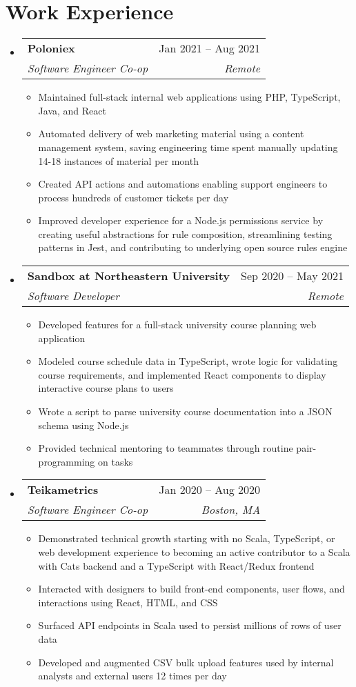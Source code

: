 \documentclass[letterpaper, 11pt]{article}
\makeatletter
\newcommand{\resumeItem}[1]{
  \item\small{
    {#1 \vspace{-2pt}}
  }
}
\newcommand{\resumeSubheading}[4]{
  \vspace{-2pt}\item
    \begin{tabular*}{0.97\textwidth}[t]{l@{\extracolsep{\fill}}r}
      \textbf{#1} & #2 \\
     \textit{\small#3} &  \textit{\small#4} \\
    \end{tabular*}\vspace{-7pt}
}
\newcommand{\resumeSubHeadingListStart}{\begin{itemize}[leftmargin=0.15in, label={}]}
\newcommand{\resumeSubHeadingListEnd}{\end{itemize}}
\newcommand{\resumeItemListStart}{\begin{itemize}}
\newcommand{\resumeItemListEnd}{\end{itemize}\vspace{-5pt}}
\makeatother
\begin{document}
\section{Work Experience}
    \resumeSubHeadingListStart    
        \resumeSubheading
            {Poloniex}{Jan 2021 -- Aug 2021}{Software Engineer Co-op}{Remote}
            \resumeItemListStart
                \resumeItem{Maintained full-stack internal web applications using PHP, TypeScript, Java, and React}
                \resumeItem{Automated delivery of web marketing material using a content management system, saving engineering time spent manually updating 14-18 instances of material per month}
                \resumeItem{Created API actions and automations enabling support engineers to process hundreds of customer tickets per day}
                \resumeItem{Improved developer experience for a Node.js permissions service by creating useful abstractions for rule composition, streamlining testing patterns in Jest, and contributing to underlying open source rules engine}
            \resumeItemListEnd
        \resumeSubheading
            {Sandbox at Northeastern University}{Sep 2020 -- May 2021}{Software Developer}{Remote}
            \resumeItemListStart
                \resumeItem{Developed features for a full-stack university course planning web application}
                \resumeItem{Modeled course schedule data in TypeScript, wrote logic for validating course requirements, and implemented React components to display interactive course plans to users}
                \resumeItem{Wrote a script to parse university course documentation into a JSON schema using Node.js}
                \resumeItem{Provided technical mentoring to teammates through routine pair-programming on tasks}
            \resumeItemListEnd
        \resumeSubheading
            {Teikametrics}{Jan 2020 -- Aug 2020}{Software Engineer Co-op}{Boston, MA}
            \resumeItemListStart
                \resumeItem{Demonstrated technical growth starting with no Scala, TypeScript, or web development experience to becoming an active contributor to a Scala with Cats backend and a TypeScript with React/Redux frontend}
                \resumeItem{Interacted with designers to build front-end components, user flows, and interactions using React, HTML, and CSS}
                \resumeItem{Surfaced API endpoints in Scala used to persist millions of rows of user data}
                \resumeItem{Developed and augmented CSV bulk upload features used by internal analysts and external users 12 times per day}
            \resumeItemListEnd
    \resumeSubHeadingListEnd
  
\end{document}
